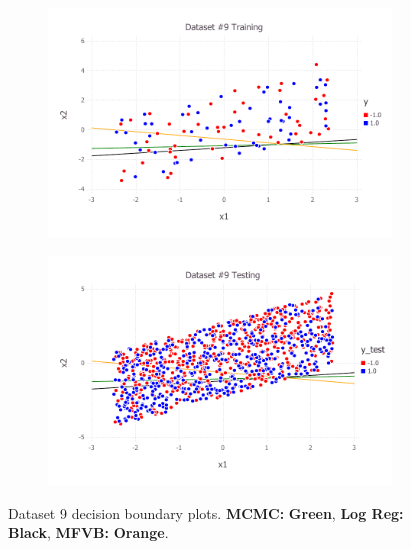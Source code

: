 \begin{figure}[h!]
\centering
    \begin{subfigure}[b]{0.45\textwidth}
	\includegraphics[scale=0.6]{figures/train_final_9.pdf}
    \end{subfigure}
    \quad
    \begin{subfigure}[b]{0.45\textwidth}
	\includegraphics[scale=0.6]{figures/test_final_9.pdf}
	\end{subfigure}
 \caption{Dataset 9 decision boundary plots. {\bf MCMC:}  {\bf \color{ao(english)} Green}, {\bf Log Reg:} {\bf \color{black} Black}, {\bf MFVB:}  {\bf \color{burntorange} Orange}.}  \label{fig:dataset_9}  
\end{figure}